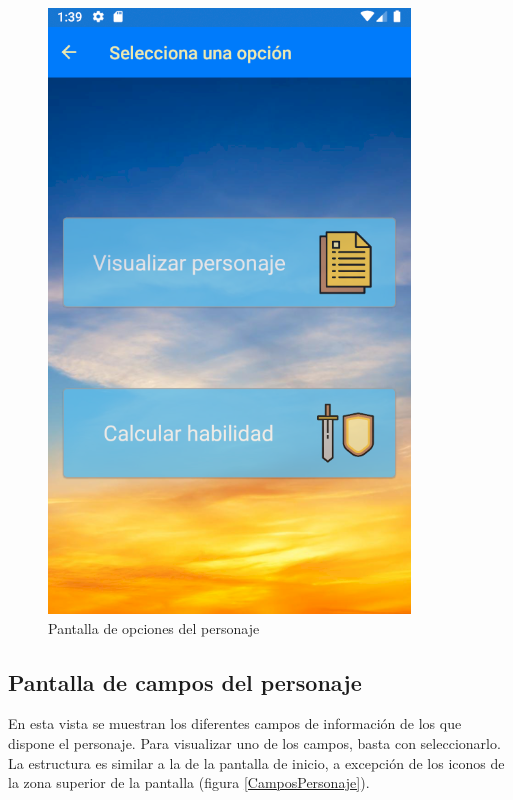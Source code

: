\begin{figure}[H]
    \centering
    \includegraphics[scale=0.7]{Figures/Capturas/OpcionesPersonaje.png}
    \caption{Pantalla de opciones del personaje}
    \label{OpcionesPersonaje}    
\end{figure}

\subsection{Pantalla de campos del personaje}
En esta vista se muestran los diferentes campos de información de los que dispone el personaje.
Para visualizar uno de los campos, basta con seleccionarlo. La estructura es similar a la de la 
pantalla de inicio, a excepción de los iconos de la zona superior de la pantalla (figura \ref*{CamposPersonaje}).

